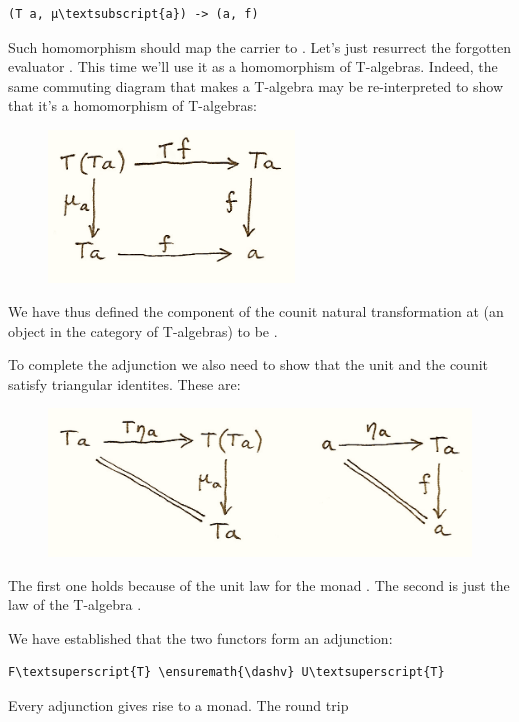 \begin{Verbatim}[commandchars=\\\{\}]
(T a, μ\textsubscript{a}) -> (a, f)
\end{Verbatim}
Such homomorphism should map the carrier  to .
Let's just resurrect the forgotten evaluator . This time we'll
use it as a homomorphism of T-algebras. Indeed, the same commuting
diagram that makes  a T-algebra may be re-interpreted to show
that it's a homomorphism of T-algebras:

\begin{figure}[H]
\centering
\includegraphics[width=2.57292in]{images/talg31.png}
\end{figure}

\noindent
We have thus defined the component of the counit natural transformation
 at  (an object in the category of T-algebras)
to be .

To complete the adjunction we also need to show that the unit and the
counit satisfy triangular identites. These are:

\begin{figure}[H]
\centering
\includegraphics[width=\textwidth]{images/talg4.png}
\end{figure}

\noindent
The first one holds because of the unit law for the monad .
The second is just the law of the T-algebra .

We have established that the two functors form an adjunction:

\begin{Verbatim}[commandchars=\\\{\}]
F\textsuperscript{T} \ensuremath{\dashv} U\textsuperscript{T}
\end{Verbatim}
Every adjunction gives rise to a monad. The round trip

